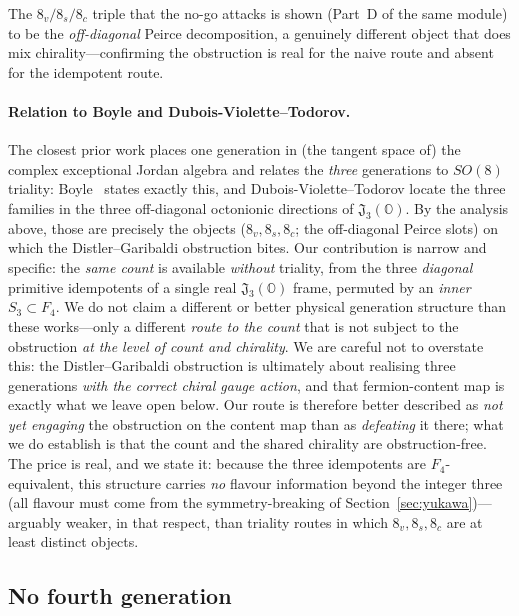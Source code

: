 \documentclass[11pt,a4paper]{article}
\theoremstyle{plain}
\newcommand{\JO}{\mathfrak{J}_3(\mathbb{O})}
\begin{document}
The $8_v/8_s/8_c$ triple that the no-go attacks is shown (Part~D of the same
module) to be the \emph{off-diagonal} Peirce decomposition, a genuinely different
object that does mix chirality---confirming the obstruction is real for the naive
route and absent for the idempotent route.

\paragraph{Relation to Boyle and Dubois-Violette--Todorov.} The closest prior work
places one generation in (the tangent space of) the complex exceptional Jordan
algebra and relates the \emph{three} generations to $SO(8)$ triality:
Boyle~\cite{boyle2020} states exactly this, and Dubois-Violette--Todorov
\cite{duboisviolette2016,todorov2018} locate the three families in the three
off-diagonal octonionic directions of $\JO$. By the analysis above, those are
precisely the objects ($8_v, 8_s, 8_c$; the off-diagonal Peirce slots) on which
the Distler--Garibaldi obstruction bites. Our contribution is narrow and specific:
the \emph{same count} is available \emph{without} triality, from the three
\emph{diagonal} primitive idempotents of a single real $\JO$ frame, permuted by an
\emph{inner} $S_3 \subset F_4$. We do not claim a different or better physical
generation structure than these works---only a different \emph{route to the count}
that is not subject to the obstruction \emph{at the level of count and chirality}.
We are careful not to overstate this: the Distler--Garibaldi obstruction is
ultimately about realising three generations \emph{with the correct chiral gauge
action}, and that fermion-content map is exactly what we leave open below. Our
route is therefore better described as \emph{not yet engaging} the obstruction on
the content map than as \emph{defeating} it there; what we do establish is that the
count and the shared chirality are obstruction-free.
The price is real, and we state it: because the three
idempotents are $F_4$-equivalent, this structure carries \emph{no} flavour
information beyond the integer three (all flavour must come from the
symmetry-breaking of Section~\ref{sec:yukawa})---arguably weaker, in that respect,
than triality routes in which $8_v, 8_s, 8_c$ are at least distinct objects.

\subsection{No fourth generation}
\end{document}
